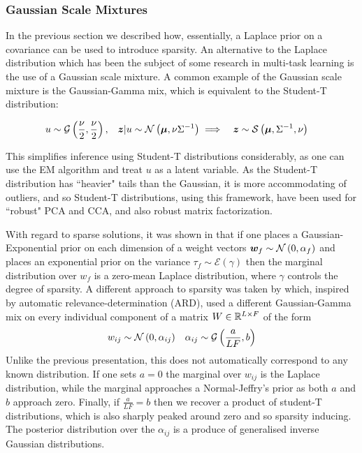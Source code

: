 

\subsubsection{Gaussian Scale Mixtures}
In the previous section we described how, essentially, a Laplace prior on a covariance can be used to introduce sparsity. An alternative to the Laplace distribution which has been the subject of some research in multi-task learning is the use of a Gaussian scale mixture. A common example of the Gaussian scale mixture is the Gaussian-Gamma mix, which is equivalent to the Student-T distribution:

\begin{align}
u & \sim \mathcal{G}\left(\frac{\nu}{2}, \frac{\nu}{2} \right) ,
& \bm z|u \sim \mathcal{N} \left( {\bm \mu}, {\nu {\Sigma}^{-1}} \right) 
& \implies & \bm z & \sim \mathcal{S}\left(\bm \mu, {\Sigma}^{-1}, \nu \right)
\end{align}

This simplifies inference using Student-T distributions considerably, as one can use the EM algorithm and treat $u$ as a latent variable. As the Student-T distribution has ``heavier" tails than the Gaussian, it is more accommodating of outliers, and so Student-T distributions, using this framework, have been used for ``robust" PCA and CCA\cite{Archambeau2006a}, and also robust matrix factorization\cite{Balaji2011}.

With regard to sparse solutions, it was shown in \cite{Figueiredo2003} that if one places a Gaussian-Exponential prior on each dimension of a weight vectors $\bm w_f \sim \mathcal{N} \left( {0}, {\alpha_f} \right)$ and places an exponential prior on the variance $\tau_f \sim \mathcal{E}\left(\gamma\right)$ then the marginal distribution over $w_f$ is a zero-mean Laplace distribution, where $\gamma$ controls the degree of sparsity. A different approach to sparsity was taken by \cite{Archambeau2009a} which, inspired by automatic relevance-determination (ARD), used a different Gaussian-Gamma mix on every individual component of a matrix $W \in { \mathbb{R}^{L \times F} }$ of the form
\begin{align}
w_{ij} &\sim \mathcal{N} \left( {0}, {\alpha_{ij}} \right) & \alpha_{ij} \sim \mathcal{G}\left(\frac{a}{LF}, b\right)
\end{align}
Unlike the previous presentation, this does not automatically correspond to any known distribution. If one sets $a=0$ the marginal over $w_{ij}$ is the Laplace distribution, while the marginal approaches a Normal-Jeffry's prior as both $a$ and $b$ approach zero. Finally, if $\frac{a}{LF} = b$ then we recover a product of student-T distributions, which is also sharply peaked around zero and so sparsity inducing. The posterior distribution over the $\alpha_{ij}$ is a produce of generalised inverse Gaussian distributions.


